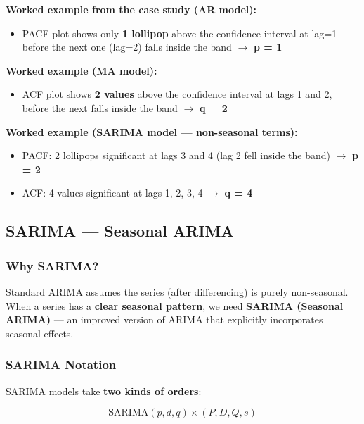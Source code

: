 \documentclass[12pt,openany]{book}
\begin{document}
\textbf{Worked example from the case study (AR model):}
\begin{itemize}[leftmargin=*]
    \item PACF plot shows only \textbf{1 lollipop} above the confidence interval at lag=1 before the next one (lag=2) falls inside the band \(\rightarrow\) \textbf{p = 1}
\end{itemize}

\textbf{Worked example (MA model):}
\begin{itemize}[leftmargin=*]
    \item ACF plot shows \textbf{2 values} above the confidence interval at lags 1 and 2, before the next falls inside the band \(\rightarrow\) \textbf{q = 2}
\end{itemize}

\textbf{Worked example (SARIMA model --- non-seasonal terms):}
\begin{itemize}[leftmargin=*]
    \item PACF: 2 lollipops significant at lags 3 and 4 (lag 2 fell inside the band) \(\rightarrow\) \textbf{p = 2}
    \item ACF: 4 values significant at lags 1, 2, 3, 4 \(\rightarrow\) \textbf{q = 4}
\end{itemize}

\subsection{SARIMA --- Seasonal ARIMA}

\subsubsection{Why SARIMA?}

Standard ARIMA assumes the series (after differencing) is purely non-seasonal. When a series has a \textbf{clear seasonal pattern}, we need \textbf{SARIMA (Seasonal ARIMA)} --- an improved version of ARIMA that explicitly incorporates seasonal effects.

\subsubsection{SARIMA Notation}

SARIMA models take \textbf{two kinds of orders}:

\begin{equation*}
    \text{SARIMA}(p, d, q) \times (P, D, Q, s)
\end{equation*}
\end{document}
